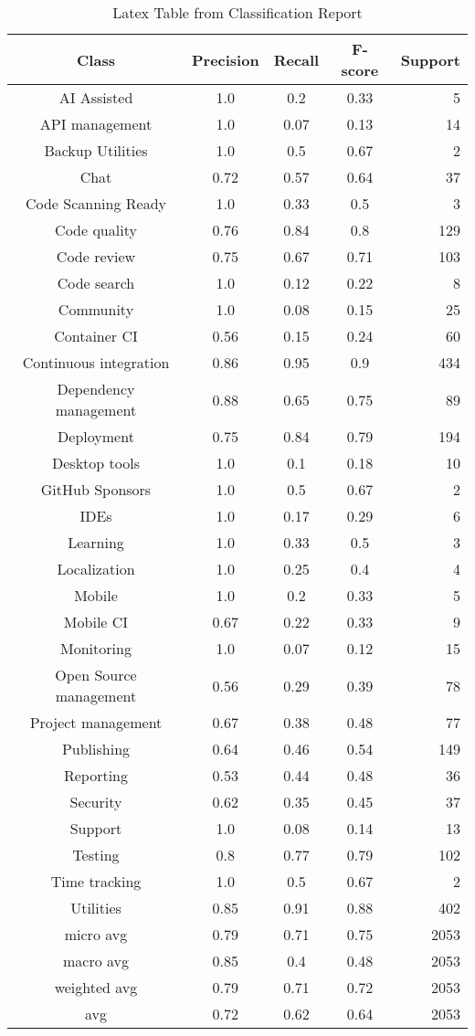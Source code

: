 \begin{table}
\caption{Latex Table from Classification Report}
\label{table:classification:report}
\centering
\begin{tabular}{c | c c c r}
Class & Precision & Recall & F-score & Support\\
\midrule
AI Assisted & 1.0 & 0.2 & 0.33 & 5\\
API management & 1.0 & 0.07 & 0.13 & 14\\
Backup Utilities & 1.0 & 0.5 & 0.67 & 2\\
Chat & 0.72 & 0.57 & 0.64 & 37\\
Code Scanning Ready & 1.0 & 0.33 & 0.5 & 3\\
Code quality & 0.76 & 0.84 & 0.8 & 129\\
Code review & 0.75 & 0.67 & 0.71 & 103\\
Code search & 1.0 & 0.12 & 0.22 & 8\\
Community & 1.0 & 0.08 & 0.15 & 25\\
Container CI & 0.56 & 0.15 & 0.24 & 60\\
Continuous integration & 0.86 & 0.95 & 0.9 & 434\\
Dependency management & 0.88 & 0.65 & 0.75 & 89\\
Deployment & 0.75 & 0.84 & 0.79 & 194\\
Desktop tools & 1.0 & 0.1 & 0.18 & 10\\
GitHub Sponsors & 1.0 & 0.5 & 0.67 & 2\\
IDEs & 1.0 & 0.17 & 0.29 & 6\\
Learning & 1.0 & 0.33 & 0.5 & 3\\
Localization & 1.0 & 0.25 & 0.4 & 4\\
Mobile & 1.0 & 0.2 & 0.33 & 5\\
Mobile CI & 0.67 & 0.22 & 0.33 & 9\\
Monitoring & 1.0 & 0.07 & 0.12 & 15\\
Open Source management & 0.56 & 0.29 & 0.39 & 78\\
Project management & 0.67 & 0.38 & 0.48 & 77\\
Publishing & 0.64 & 0.46 & 0.54 & 149\\
Reporting & 0.53 & 0.44 & 0.48 & 36\\
Security & 0.62 & 0.35 & 0.45 & 37\\
Support & 1.0 & 0.08 & 0.14 & 13\\
Testing & 0.8 & 0.77 & 0.79 & 102\\
Time tracking & 1.0 & 0.5 & 0.67 & 2\\
Utilities & 0.85 & 0.91 & 0.88 & 402\\
\midrule
micro avg & 0.79 & 0.71 & 0.75 & 2053\\
macro avg & 0.85 & 0.4 & 0.48 & 2053\\
weighted avg & 0.79 & 0.71 & 0.72 & 2053\\
avg & 0.72 & 0.62 & 0.64 & 2053\\
\end{tabular}
\end{table}